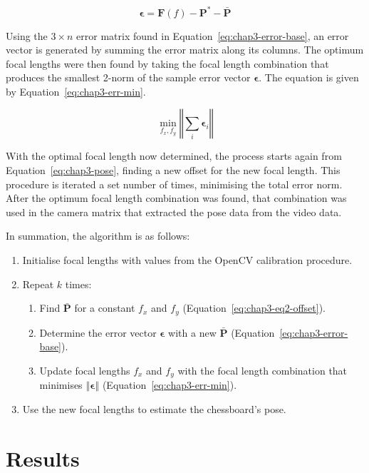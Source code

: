 \begin{equation}
  \label{eq:chap3-error-base}
  \bm{\epsilon} = \bm{F}(f) - \bm{P}^* - \bar{\bm{P}}
\end{equation}

Using the $3\times n$ error matrix found in Equation~\ref{eq:chap3-error-base}, an error vector is generated by summing the error matrix along its columns. The optimum focal lengths were then found by taking the focal length combination that produces the smallest 2-norm of the sample error vector $\bm{\epsilon}$. The equation is given by Equation~\ref{eq:chap3-err-min}.

\begin{equation}
  \label{eq:chap3-err-min}
  \min_{f_x, f_y}\left \Vert \sum_i  \bm{\epsilon}_i \right \Vert
\end{equation}

With the optimal focal length now determined, the process starts again from Equation~\ref{eq:chap3-pose}, finding a new offset for the new focal length. This procedure is iterated a set number of times, minimising the total error norm. After the optimum focal length combination was found, that combination was used in the camera matrix that extracted the pose data from the video data.

In summation, the algorithm is as follows:

\begin{enumerate}
  \item Initialise focal lengths with values from the OpenCV calibration procedure. 
  \item Repeat $k$ times:
  \begin{enumerate}
    \item Find $\bar{\bm{P}}$ for a constant $f_x$ and $f_y$ (Equation~\ref{eq:chap3-eq2-offset}).
    \item Determine the error vector $\bm{\epsilon}$ with a new $\bar{\bm{P}}$ (Equation~\ref{eq:chap3-error-base}).
    \item Update focal lengths $f_x$ and $f_y$ with the focal length combination that minimises $\left \Vert \bm{\epsilon} \right \Vert$ (Equation~\ref{eq:chap3-err-min}).
  \end{enumerate}
  \item Use the new focal lengths to estimate the chessboard's pose.
\end{enumerate}

\section{Results}

